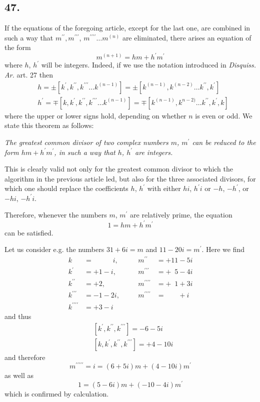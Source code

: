 \documentclass[twoside,12pt]{memoir}
\begin{document}
\subsection*{47.}

If the equations of the foregoing article, except for the last one, are combined in such a way that \(m^{\prime \prime}, m^{\prime \prime \prime}\), \(m^{\prime \prime \prime \prime} \ldots m^{(n)}\) are eliminated, there arises an equation of the form
\[m^{(n+1)}=h m+h^{\prime} m^{\prime}\]\pagebreak%
where \(h\), \(h^{\prime}\) will be integers. Indeed, if we use the notation introduced in \textit{Disquiss. Ar.} art. 27 then
\[\begin{aligned}
& h= \pm\left[k^{\prime}, k^{\prime \prime}, k^{\prime \prime \prime} \ldots k^{(n-1)}\right]= \pm\left[k^{(n-1)}, k^{(n-2)} \ldots k^{\prime \prime}, k^{\prime}\right] \\
& h^{\prime}=\mp\left[k, k^{\prime}, k^{\prime \prime}, k^{\prime \prime \prime} \ldots k^{(n-1)}\right]=\mp\left[k^{(n-1)}, k^{n-2)} \ldots k^{\prime \prime}, k^{\prime}, k\right]
\end{aligned}\]
where the upper or lower signs hold, depending on whether \(n\) is even or odd. We state this theorem as follows:

\textit{The greatest common divisor of two complex numbers \(m\), \(m^{\prime}\) can be reduced to the form \(h m+h^{\prime} m^{\prime}\), in such a way that \(h\), \(h^{\prime}\) are integers.}

This is clearly valid not only for the greatest common divisor to which the algorithm in the previous article led, but also for the three associated divisors, for which one should replace the coefficients \(h\), \(h^{\prime}\) with either \(hi\), \(h^{\prime}i\) or \(-h\), \(-h^{\prime}\), or \(-hi\), \(-h^{\prime}i\).

Therefore, whenever the numbers \(m\), \(m^{\prime}\) are relatively prime, the equation
\[1 = hm + h^{\prime}m^{\prime}\]
can be satisfied.

Let us consider e{.}g{.} the numbers \(31+6i=m\) and \(11-20i=m^{\prime}\). Here we find
\[\begin{array}{clccl}
k&=\phantom{+1-\;} i,&\quad& m^{\prime \prime}&=+11-5 i \\
k^{\prime}&=+1-i, &\quad& m^{\prime \prime \prime}&=+\phantom{0}5-4 i \\
k^{\prime \prime}&=+2, &\quad& m^{\prime \prime \prime \prime}&=+\phantom{0}1+3 i \\
k^{\prime \prime \prime}&=-1-2 i, &\quad& m^{\prime \prime \prime \prime}&=\phantom{+00}+i \\
k^{\prime \prime \prime \prime}&=+3-i &\quad&&
\end{array}\]
and thus
\[\begin{aligned}
& {\left[k^{\prime}, k^{\prime \prime}, k^{\prime \prime \prime}\right]=-6-5i} \\
& {\left[k, k^{\prime}, k^{\prime \prime}, k^{\prime \prime \prime}\right]=+4-10i}
\end{aligned}\]
and therefore
\[m^{\prime \prime \prime \prime \prime}=i=(6+5i)m+(4-10i)m^{\prime}\]
as well as
\[1=(5-6i)m+(-10-4i)m^{\prime}\]
which is confirmed by calculation.
\end{document}
